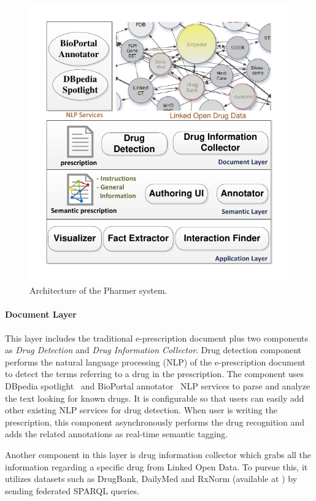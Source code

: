 \documentclass[10pt, conference, compsocconf]{IEEEtran}
\begin{document}
\begin{figure}[tb]
	\centering
		\includegraphics[width=0.95\columnwidth]{images/architecture.pdf}
	\caption{Architecture of the Pharmer system.}
	\label{fig:arch}
\end{figure}

\paragraph{Document Layer} This layer includes the traditional e-prescription document plus two components as \emph{Drug Detection} and \emph{Drug Information Collector}.
Drug detection component performs the natural language processing (NLP) of the e-prescription document to detect the terms referring to a drug in the prescription.
The component uses DBpedia spotlight~\cite{dbspotlight} and BioPortal annotator~\cite{bioportal} NLP services to parse and analyze the text looking for known drugs.
It is configurable so that users can easily add other existing NLP services for drug detection.
When user is writing the prescription, this component asynchronously performs the drug recognition and adds the related annotations as real-time semantic tagging.

Another component in this layer is drug information collector which grabs all the information regarding a specific drug from Linked Open Data.
To pursue this, it utilizes datasets such as DrugBank, DailyMed and RxNorm (available at \cite{lodd}) by sending federated SPARQL queries.
\end{document}

